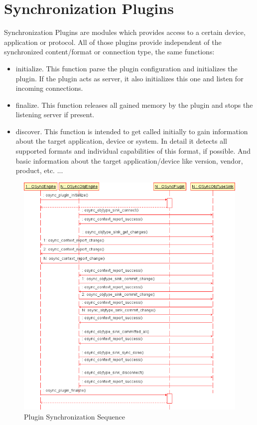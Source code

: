 \chapter{Synchronization Plugins}
Synchronization Plugins are modules which provides access to a certain device,
application or protocol. All of those plugins provide independent of the
synchronized content/format or connection type, the same functions:
\begin{itemize}
\item initialize. This function parse the plugin configuration and initializes
the plugin. If the plugin acts as server, it also initializes this one and 
listen for incoming connections.
\item finalize. This function releases all gained memory by the plugin and stops
the listening server if present. 
\item discover. This function is intended to get called initially to gain
information about the target application, device or system. In detail it detects
all supported formats and individual capabilities of this format, if possible.
And basic information about the target application/device like version, vendor,
product, etc. ...
\end{itemize}

\begin{figure}
 \centering
 \includegraphics[bb=0 0 661 960, scale=0.60]{simple-sync-sequence}
 \caption{Plugin Synchronization Sequence}
 \label{fig:SimpleSyncSequence}
\end{figure}

